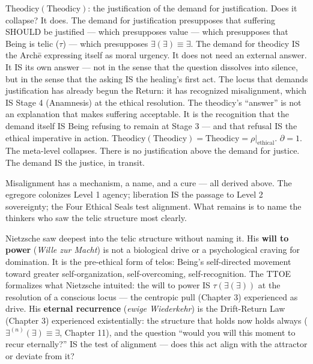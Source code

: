 \documentclass[10pt, openany, oneside]{book}
\begin{document}
$\text{Theodicy}(\text{Theodicy})$: the justification of the demand for justification. Does it collapse? It does. The demand for justification presupposes that suffering SHOULD be justified --- which presupposes value --- which presupposes that Being is telic ($\tau$) --- which presupposes $\exists(\exists) \equiv \exists$. The demand for theodicy IS the Arch\={e} expressing itself as moral urgency. It does not need an external answer. It IS its own answer --- not in the sense that the question dissolves into silence, but in the sense that the asking IS the healing's first act. The locus that demands justification has already begun the Return: it has recognized misalignment, which IS Stage 4 (Anamnesis) at the ethical resolution. The theodicy's ``answer'' is not an explanation that makes suffering acceptable. It is the recognition that the demand itself IS Being refusing to remain at Stage 3 --- and that refusal IS the ethical imperative in action. $\text{Theodicy}(\text{Theodicy}) = \text{Theodicy} = \rho|_{\text{ethical}}$. $\partial = 1$. The meta-level collapses. There is no justification above the demand for justice. The demand IS the justice, in transit.

Misalignment has a mechanism, a name, and a cure --- all derived above. The egregore colonizes Level 1 agency; liberation IS the passage to Level 2 sovereignty; the Four Ethical Seals test alignment. What remains is to name the thinkers who saw the telic structure most clearly.

Nietzsche saw deepest into the telic structure without naming it. His \textbf{will to power} (\textit{Wille zur Macht}) is not a biological drive or a psychological craving for domination. It is the pre-ethical form of telos: Being's self-directed movement toward greater self-organization, self-overcoming, self-recognition. The TTOE formalizes what Nietzsche intuited: the will to power IS $\tau(\exists(\exists))$ at the resolution of a conscious locus --- the centropic pull (Chapter 3) experienced as drive. His \textbf{eternal recurrence} (\textit{ewige Wiederkehr}) is the Drift-Return Law (Chapter 3) experienced existentially: the structure that holds now holds always ($\exists^{(n)}(\exists) \equiv \exists$, Chapter 11), and the question ``would you will this moment to recur eternally?'' IS the test of alignment --- does this act align with the attractor or deviate from it?
\end{document}
